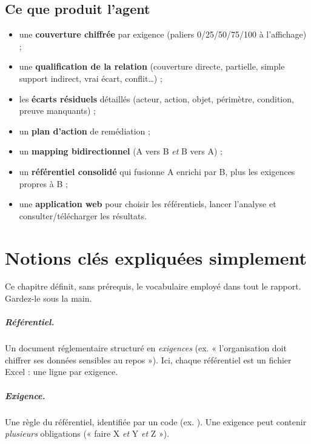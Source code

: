 \documentclass[11pt,a4paper]{report}
\newcommand{\code}[1]{\texttt{\detokenize{#1}}}
\begin{document}
\section{Ce que produit l'agent}
\begin{itemize}[nosep]
  \item une \textbf{couverture chiffrée} par exigence (paliers 0/25/50/75/100 à l'affichage) ;
  \item une \textbf{qualification de la relation} (couverture directe, partielle, simple support indirect, vrai écart, conflit\ldots) ;
  \item les \textbf{écarts résiduels} détaillés (acteur, action, objet, périmètre, condition, preuve manquants) ;
  \item un \textbf{plan d'action} de remédiation ;
  \item un \textbf{mapping bidirectionnel} (A vers B \emph{et} B vers A) ;
  \item un \textbf{référentiel consolidé} qui fusionne A enrichi par B, plus les exigences propres à B ;
  \item une \textbf{application web} pour choisir les référentiels, lancer l'analyse et consulter/télécharger les résultats.
\end{itemize}

\chapter{Notions clés expliquées simplement}
\label{ch:concepts}

Ce chapitre définit, sans prérequis, le vocabulaire employé dans tout le rapport. Gardez-le sous la main.

\paragraph{Référentiel.} Un document réglementaire structuré en \emph{exigences} (ex. « l'organisation doit chiffrer ses données sensibles au repos »). Ici, chaque référentiel est un fichier Excel : une ligne par exigence.

\paragraph{Exigence.} Une règle du référentiel, identifiée par un code (ex. \code{PR.DS-01.6}). Une exigence peut contenir \emph{plusieurs} obligations (« faire X \emph{et} Y \emph{et} Z »).
\end{document}
